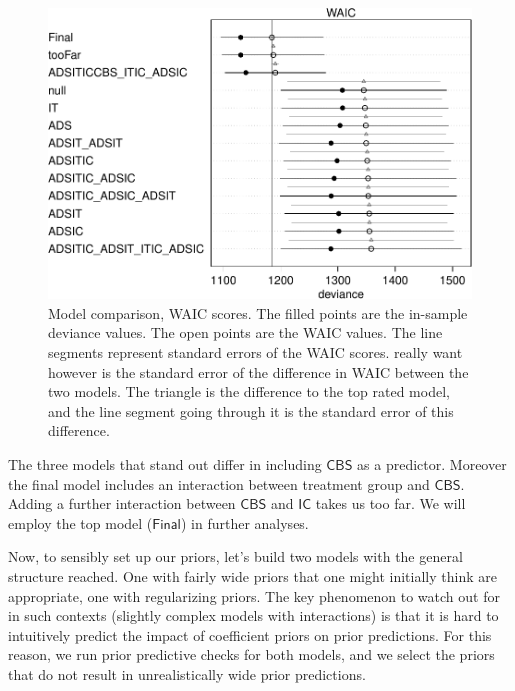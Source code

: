\documentclass[preprint,12pt]{elsarticle}
\begin{document}
\normalsize 


\begin{figure}

\begin{center}\includegraphics[width=1\linewidth]{ figures/fig:modelComparison-1} \end{center}
\caption{Model comparison, WAIC scores. The filled points are the in-sample deviance values. The open points are the WAIC values. The line segments represent standard errors of the WAIC scores. really want however is the standard error of the difference in WAIC
between the two models. The triangle is the difference to the top rated model, and the line segment going through it is the standard error of this difference.}
\label{fig:modelComparisonPlot}
\end{figure}





The three models that stand out differ in including \(\mathsf{CBS}\) as
a predictor. Moreover the final model includes an interaction between
treatment group and \(\mathsf{CBS}\). Adding a further interaction
between \(\mathsf{CBS}\) and \(\mathsf{IC}\) takes us too far. We will
employ the top model (\(\mathsf{Final}\)) in further analyses.





Now, to sensibly set up our priors, let's  build two models with the general structure reached. One with fairly
wide priors that one might initially think are appropriate, one with
regularizing priors. The key phenomenon to watch out for in such
contexts (slightly complex models with interactions) is that it is hard
to intuitively predict the impact of coefficient priors on prior
predictions. For this reason, we run prior predictive checks for both
models, and we select the priors that do not result in unrealistically wide prior predictions. 
\end{document}
